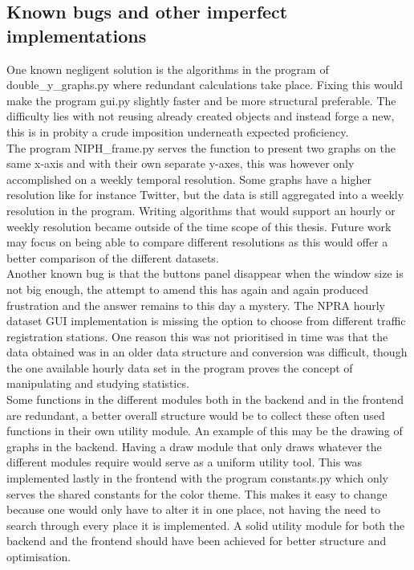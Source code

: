 \subsection{Known bugs and other imperfect implementations}
One known negligent solution is the algorithms in the program of double\_y\_graphs.py where redundant calculations take place. Fixing this would make the program gui.py slightly faster and be more structural preferable. The difficulty lies with not reusing already created objects and instead forge a new, this is in probity a crude imposition underneath expected proficiency.\\
The program NIPH\_frame.py serves the function to present two graphs on the same x-axis and with their own separate y-axes, this was however only accomplished on a weekly temporal resolution. Some graphs have a higher resolution like for instance Twitter, but the data is still aggregated into a weekly resolution in the program. Writing algorithms that would support an hourly or weekly resolution became outside of the time scope of this thesis. Future work may focus on being able to compare different resolutions as this would offer a better comparison of the different datasets.\\
Another known bug is that the buttons panel disappear when the window size is not big enough, the attempt to amend this has again and again produced frustration and the answer remains to this day a mystery.
The NPRA hourly dataset GUI implementation is missing the option to choose from different traffic registration stations. One reason this was not prioritised in time was that the data obtained was in an older data structure and conversion was difficult, though the one available hourly data set in the program proves the concept of manipulating and studying statistics.\\
Some functions in the different modules both in the backend and in the frontend are redundant, a better overall structure would be to collect these often used functions in their own utility module. An example of this may be the drawing of graphs in the backend. Having a draw module that only draws whatever the different modules require would serve as a uniform utility tool. This was implemented lastly in the frontend with the program constants.py which only serves the shared constants for the color theme. This makes it easy to change because one would only have to alter it in one place, not having the need to search through every place it is implemented. A solid utility module for both the backend and the frontend should have been achieved for better structure and optimisation.

